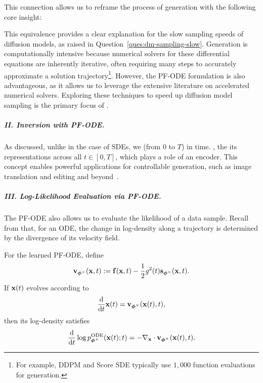 This connection allows us to reframe the process of generation with the following core insight:

This equivalence provides a clear explanation for the slow sampling speeds of diffusion models, as raised in Question~\ref{ques:dm-sampling-slow}. Generation is computationally intensive because numerical solvers for these differential equations are inherently iterative, often requiring many steps to accurately approximate a solution trajectory\footnote{For example, DDPM and Score SDE typically use $1,000$ function evaluations for generation.}. However, the PF-ODE formulation is also advantageous, as it allows us to leverage the extensive literature on accelerated numerical solvers. Exploring these techniques to speed up diffusion model sampling is the primary focus of .



\subparagraph{II. Inversion with PF-ODE.} As discussed, unlike in the case of SDEs, we    (from $0$ to $T$)   in time. , the  its  representations across all $t \in [0,T]$, which plays a role of an encoder. This concept enables powerful applications for controllable generation, such as image translation and editing and beyond~\citep{mokady2023null,su2022dual}.

\subparagraph{III. Log-Likelihood Evaluation via PF-ODE.}
The PF-ODE also allows us to evaluate the likelihood of a data sample.
Recall from  that, for an ODE, the change in
log-density along a trajectory is determined by the divergence of its velocity
field.

For the learned PF-ODE, define
\[
{\mathbf{v}}_{\bm{\phi}^\times}({\mathbf{x}},t)
:=
{\mathbf{f}}({\mathbf{x}},t)
-\frac{1}{2}g^2(t){\mathbf{s}}_{\bm{\phi}^\times}({\mathbf{x}},t).
\]
If ${\mathbf{x}}(t)$ evolves according to
\[
\frac{\mathop{}\!\mathrm{d}}{\mathop{}\!\mathrm{d} t}{\mathbf{x}}(t)
=
{\mathbf{v}}_{\bm{\phi}^\times}({\mathbf{x}}(t),t),
\]
then its log-density satisfies
\[
\frac{\mathop{}\!\mathrm{d}}{\mathop{}\!\mathrm{d} t}
\log p^{\textup{ODE}}_{\bm{\phi}^\times}({\mathbf{x}}(t);t)
=
-\nabla_{{\mathbf{x}}}\cdot
{\mathbf{v}}_{\bm{\phi}^\times}({\mathbf{x}}(t),t).
\]

